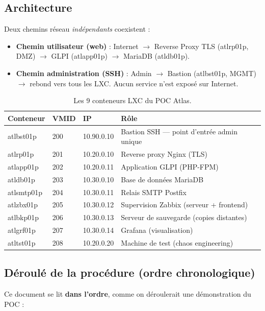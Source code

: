 \documentclass[11pt,a4paper]{article}
\begin{document}
\subsection{Architecture}
Deux chemins réseau \emph{indépendants} coexistent :

\begin{itemize}[leftmargin=1.4em]
  \item \textbf{Chemin utilisateur (web)} : Internet $\rightarrow$ Reverse Proxy TLS
        (atlrp01p, DMZ) $\rightarrow$ GLPI (atlapp01p) $\rightarrow$ MariaDB (atldb01p).
  \item \textbf{Chemin administration (SSH)} : Admin $\rightarrow$ Bastion (atlbst01p, MGMT)
        $\rightarrow$ rebond vers tous les LXC. Aucun service n'est exposé sur Internet.
\end{itemize}

\begin{table}[h]
\centering\small
\renewcommand{\arraystretch}{1.2}
\begin{tabularx}{\linewidth}{@{}l l l X@{}}
\toprule
\textbf{Conteneur} & \textbf{VMID} & \textbf{IP} & \textbf{Rôle} \\
\midrule
atlbst01p & 200 & 10.90.0.10 & Bastion SSH — point d'entrée admin unique \\
atlrp01p  & 201 & 10.20.0.10 & Reverse proxy Nginx (TLS) \\
atlapp01p & 202 & 10.20.0.11 & Application GLPI (PHP-FPM) \\
atldb01p  & 203 & 10.30.0.10 & Base de données MariaDB \\
atlsmtp01p& 204 & 10.30.0.11 & Relais SMTP Postfix \\
atlzbx01p & 205 & 10.30.0.12 & Supervision Zabbix (serveur + frontend) \\
atlbkp01p & 206 & 10.30.0.13 & Serveur de sauvegarde (copies distantes) \\
atlgrf01p & 207 & 10.30.0.14 & Grafana (visualisation) \\
atltst01p & 208 & 10.20.0.20 & Machine de test (chaos engineering) \\
\bottomrule
\end{tabularx}
\caption{Les 9 conteneurs LXC du POC Atlas.}
\end{table}

\subsection{Déroulé de la procédure (ordre chronologique)}
Ce document se lit \textbf{dans l'ordre}, comme on déroulerait une démonstration du POC :
\end{document}
